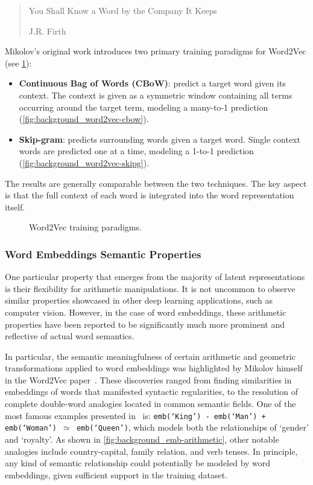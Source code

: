 \blockquote[J.R. Firth]{You Shall Know a Word by the Company It Keeps}

Mikolov's original work introduces two primary training paradigms for Word2Vec (see \cref{fig:background_word2vec-cbow_word2vec-skipg}):
\begin{itemize}
    \item \textbf{Continuous Bag of Words (CBoW)}: predict a target word given its context.
The context is given as a symmetric window containing all terms occurring around the target term, modeling a many-to-1 prediction (\cref{fig:background_word2vec-cbow}).
    \item \textbf{Skip-gram}: predicts surrounding words given a target word.
Single context words are predicted one at a time, modeling a 1-to-1 prediction (\cref{fig:background_word2vec-skipg}).
\end{itemize}
The results are generally comparable between the two techniques.
The key aspect is that the full context of each word is integrated into the word representation itself.

\begin{figure}[t!]
    \centering
    \quad
    \caption{Word2Vec training paradigms.}
    \label{fig:background_word2vec-cbow_word2vec-skipg}
\end{figure}

\subsubsection*{Word Embeddings Semantic Properties}

One particular property that emerges from the majority of latent representations is their flexibility for arithmetic manipulations.
It is not uncommon to observe similar properties showcased in other deep learning applications, such as computer vision.
However, in the case of word embeddings, these arithmetic properties have been reported to be significantly much more prominent and reflective of actual word semantics.

In particular, the semantic meaningfulness of certain arithmetic and geometric transformations applied to word embeddings was highlighted by Mikolov himself in the Word2Vec paper~\cite{mikolov2013}.
These discoveries ranged from finding similarities in embeddings of words that manifested syntactic regularities, to the resolution of complete double-word analogies located in common semantic fields.
One of the most famous examples presented in~\cite{mikolov2013} is: \texttt{emb(`King') - emb(`Man') + emb(`Woman') $\simeq$ emb(`Queen')}, which models both the relationships of `gender' and `royalty'.
As shown in \cref{fig:background_emb-arithmetic}, other notable analogies include country-capital, family relation, and verb tenses.
In principle, any kind of semantic relationship could potentially be modeled by word embeddings, given sufficient support in the training dataset.

